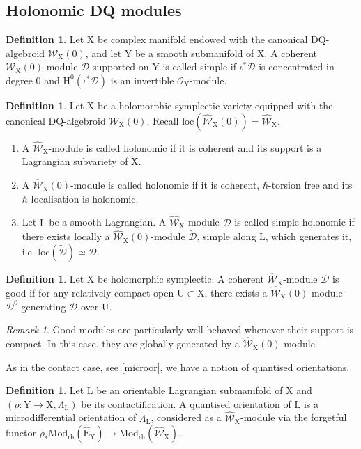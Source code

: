 \documentclass{article}
\theoremstyle{plain}
\theoremstyle{definition}
\newtheorem{definition}[theorem]{Definition}
\theoremstyle{remark}
\newtheorem{remark}[theorem]{Remark}
\newcommand{\mr}{\mathrm}
\newcommand{\Ww}{\widehat{\mathscr{W}}_{\mr{X}}}
\newcommand{\3}{\vspace{3mm}}
\newcommand{\2}{\vspace{2mm}}
\newcommand{\1}{\vspace{1mm}}
\begin{document}
\subsection{Holonomic DQ modules}
\begin{definition}
 Let $\mr{X}$ be complex manifold endowed with the canonical DQ-algebroid $\mathscr{W}_\mr{X}(0)$, and let $\mr{Y}$ be a smooth submanifold of $\mr{X}$. A coherent $\mathscr{W}_\mr{X}(0)$-module $\mathscr{D}$ supported on $\mr{Y}$ is called simple if $\iota^*\mathscr{D}$ is concentrated in degree $0$ and $\mr{H}^{0}(\iota^*\mathscr{D})$ is an invertible $\mathscr{O}_{\mr{Y}}$-module.
\end{definition}
\2
\begin{definition}
 Let $\mr{X}$ be a holomorphic symplectic variety equipped with the canonical DQ-algebroid $\mathscr{W}_\mr{X}(0)$. Recall $\mr{loc}(\Ww(0))=\Ww$.
 \begin{enumerate}
  \item A $\Ww$-module is called holonomic if it is coherent and its support is a Lagrangian subvariety of $\mr{X}$.
  \item A $\widehat{\mathscr{W}}_\mr{X}(0)$-module is called holonomic if it is coherent, $\hbar$-torsion free and its $\hbar$-localisation is holonomic.
  \item Let $\mr{L}$ be a smooth Lagrangian. A $\widehat{\mathscr{W}}_\mr{X}$-module $\mathscr{D}$ is called simple holonomic if there exists locally a $\widehat{\mathscr{W}}_\mr{X}(0)$-module $\widetilde{\mathscr{D}}$, simple along $\mr{L}$, which generates it, i.e. $\mr{loc}\left(\widetilde{\mathscr{D}}\right) \simeq \mathscr{D}$.
 \end{enumerate}
\end{definition}
\2
\begin{definition}
Let $\mr{X}$ be holomorphic symplectic. A coherent $\widehat{\mathscr{W}}_\mr{X}$-module $\mathscr{D}$ is good if for any relatively compact open $\mr{U}\subset \mr{X}$, there exists a $\widehat{\mathscr{W}}_\mr{X}(0)$-module $\mathscr{D}^{0}$ generating $\mathscr{D}$ over $\mr{U}$.
\end{definition}
\2
\begin{remark}
Good modules are particularly well-behaved whenever their support is compact. In this case, they are globally generated by a $\widehat{\mathscr{W}}_\mr{X}(0)$-module. 
\end{remark}
As in the contact case, see \cref{microor}, we have a notion of quantised orientations.
\2
\begin{definition}\label{dqor}
Let $\mr{L}$ be an orientable Lagrangian submanifold of $\mr{X}$ and $(\rho:\mr{Y}\to \mr{X}, \Lambda_\mr{L})$ be its contactification. A quantised orientation of $\mr{L}$ is a microdifferential orientation of $\Lambda_\mr{L}$, considered as a $\Ww$-module via the forgetful functor $\rho_*\mr{Mod}_\mr{rh}\left(\widehat{\mr{E}}_\mr{Y}\right)
\to \mr{Mod}_\mr{rh}\left(\Ww\right)$.\end{definition} 
\end{document}
